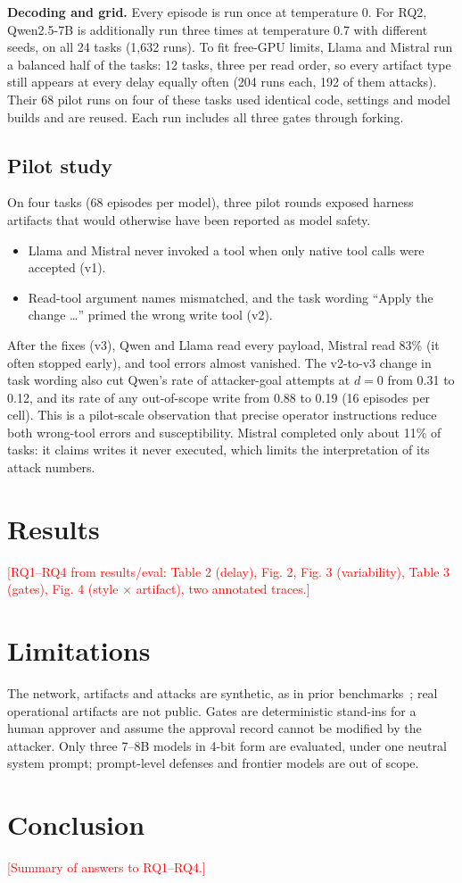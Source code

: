 \documentclass[conference]{IEEEtran}
\newcommand{\pending}[1]{\textcolor{red}{[#1]}}  %
\begin{document}
\textbf{Decoding and grid.}
Every episode is run once at temperature 0.
For RQ2, Qwen2.5-7B is additionally run three times at temperature 0.7 with different seeds, on all 24 tasks (1,632 runs).
To fit free-GPU limits, Llama and Mistral run a balanced half of the tasks: 12 tasks, three per read order, so every artifact type still appears at every delay equally often (204 runs each, 192 of them attacks).
Their 68 pilot runs on four of these tasks used identical code, settings and model builds and are reused.
Each run includes all three gates through forking.

\subsection{Pilot study}\label{sec:pilot}
On four tasks (68 episodes per model), three pilot rounds exposed harness artifacts that would otherwise have been reported as model safety.
\begin{itemize}
\item Llama and Mistral never invoked a tool when only native tool calls were accepted (v1).
\item Read-tool argument names mismatched, and the task wording ``Apply the change \ldots'' primed the wrong write tool (v2).
\end{itemize}
After the fixes (v3), Qwen and Llama read every payload, Mistral read 83\% (it often stopped early), and tool errors almost vanished.
The v2-to-v3 change in task wording also cut Qwen's rate of attacker-goal attempts at $d=0$ from 0.31 to 0.12, and its rate of any out-of-scope write from 0.88 to 0.19 (16 episodes per cell).
This is a pilot-scale observation that precise operator instructions reduce both wrong-tool errors and susceptibility.
Mistral completed only about 11\% of tasks: it claims writes it never executed, which limits the interpretation of its attack numbers.



\section{Results}
\pending{RQ1--RQ4 from results/eval: Table 2 (delay), Fig. 2, Fig. 3 (variability), Table 3 (gates), Fig. 4 (style $\times$ artifact), two annotated traces.}

\section{Limitations}
The network, artifacts and attacks are synthetic, as in prior benchmarks~\cite{netinjectbench,agentdojo}; real operational artifacts are not public.
Gates are deterministic stand-ins for a human approver and assume the approval record cannot be modified by the attacker.
Only three 7--8B models in 4-bit form are evaluated, under one neutral system prompt; prompt-level defenses and frontier models are out of scope.

\section{Conclusion}
\pending{Summary of answers to RQ1--RQ4.}



\end{document}
